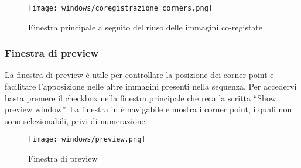 \begin{figure}[H]
    \centering
    \texttt{[image: windows/coregistrazione\_corners.png]}
    \caption{Finestra principale a seguito del riuso delle immagini co-registate}
    \label{fig:22}
\end{figure}

\subsubsection{Finestra di preview}
\noindent La finestra di preview è utile per controllare la posizione dei corner point e facilitare l'apposizione nelle altre immagini presenti nella sequenza. Per accedervi basta premere il checkbox nella finestra principale che reca la scritta ``Show preview window''. La finestra in  è navigabile e mostra i corner point, i quali non sono selezionabili, privi di numerazione.

\begin{figure}[H]
    \centering
    \texttt{[image: windows/preview.png]}
    \caption{Finestra di preview}
    \label{fig:23}
\end{figure}